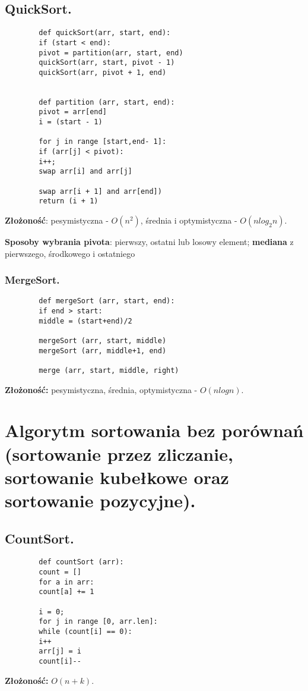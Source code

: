 \documentclass[main.tex]{subfiles}
\begin{document}
    \subsection{QuickSort.}

    \begin{verbatim}
        def quickSort(arr, start, end):
        if (start < end):
        pivot = partition(arr, start, end)
        quickSort(arr, start, pivot - 1)
        quickSort(arr, pivot + 1, end)


        def partition (arr, start, end):
        pivot = arr[end]
        i = (start - 1)

        for j in range [start,end- 1]:
        if (arr[j] < pivot):
        i++;
        swap arr[i] and arr[j]

        swap arr[i + 1] and arr[end])
        return (i + 1)
    \end{verbatim}
    \textbf{Złożoność}: pesymistyczna - $O(n^2)$, średnia i optymistyczna - $O(nlog_2 n)$.

    \noindent \textbf{Sposoby wybrania pivota}: pierwszy, ostatni lub losowy element; \textbf{mediana} z pierwszego,
    środkowego i ostatniego

    \subsubsection{MergeSort.}

    \begin{verbatim}
        def mergeSort (arr, start, end):
        if end > start:
        middle = (start+end)/2

        mergeSort (arr, start, middle)
        mergeSort (arr, middle+1, end)

        merge (arr, start, middle, right)
    \end{verbatim}
    \textbf{Złożoność:} pesymistyczna, średnia, optymistyczna - $O(nlogn)$.


    \section{Algorytm sortowania bez porównań (sortowanie przez zliczanie, sortowanie kubełkowe oraz sortowanie pozycyjne).}

    \subsection{CountSort.}
    \begin{verbatim}
        def countSort (arr):
        count = []
        for a in arr:
        count[a] += 1

        i = 0;
        for j in range [0, arr.len]:
        while (count[i] == 0):
        i++
        arr[j] = i
        count[i]--
    \end{verbatim}
    \textbf{Złożoność:} $O(n+k)$.
\end{document}
